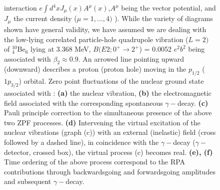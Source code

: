 \begin{figure}
{  	interaction $e \int d^4 x J_{\mu}(x) A^{\mu} (x)$,$A^{\mu}$ being 
  	the vector potential, and $J_{\mu}$ the current density ($\mu=1,...,4)$ \cite{Holstein}).
  	While the variety of diagrams shown have general validity, we have assumed
  	 we are dealing with the low-lying correlated particle-hole quadrupole vibration 
  	($L=2)$ of $^{10}_4$Be$_6$ lying at 3.368 MeV,  $B(E2; 0^+ \to 2^+$) = 0.0052 $e^2 b^2$ being
  	associated with $\beta_2 \approx 0.9$. An arrowed line pointing  upward (downward) 
  	describes a proton (proton hole) moving in the $p_{1/2}$ ($1p_{3/2}$) orbital. 
  	Zero point fluctuations of the nuclear ground state associated with : {\bf (a)} the nuclear
  	vibration, {\bf (b)} the electromagnetic field associated with the corresponding spontaneous
  	$\gamma-$decay.   {\bf (c)} Pauli principle correction to the simultaneous presence 
  	of the above two ZPF processes. {\bf (d)} Intervening the virtual excitation of the nuclear vibrations 
  	(graph (c)) with an external (inelastic) field  (cross followed by a dashed line), in coincidence with the $\gamma-$decay 
  	($\gamma-$detector, crossed box), the virtual process (c) becomes real. {\bf (e), (f)}  Time ordering of the 
  	above process correspond to the  RPA contributions through backwardsgoing and forwardsgoing amplitudes
  	\cite{Bohr} and subsequent $\gamma-$decay.
  	}\label{fig6.6.2}
  \end{figure}
  
